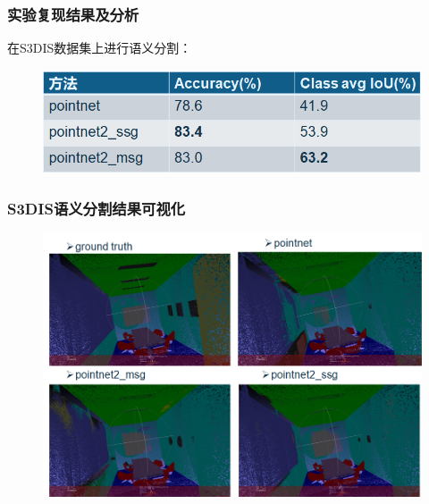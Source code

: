 \begin{frame}
  \frametitle{实验复现结果及分析}

在S3DIS数据集上进行语义分割：


\begin{figure}
\includegraphics[scale=0.35]{doc/img/t4.png}
\end{figure}

\end{frame}


\begin{frame}
  \frametitle{S3DIS语义分割结果可视化}

\begin{figure}
\includegraphics[scale=0.3]{doc/img/f7.png}
\end{figure}


\end{frame}

